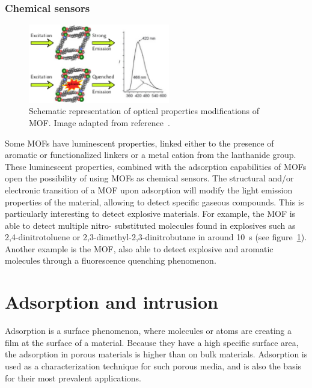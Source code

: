 \documentclass[thesis]{subfiles}
\begin{document}
\subsubsection{Chemical sensors}

\begin{figure}[ht]
    \centering
    \includegraphics[width=0.55\textwidth]{figures/cited/chemical-sensor}
    \caption{Schematic representation of optical properties modifications of
     MOF. Image adapted from reference~\cite{Lan2009}.}
    \label{fig:chemical-sensor}
\end{figure}

Some MOFs have luminescent properties, linked either to the presence of aromatic
or functionalized linkers or a metal cation from the lanthanide group. These
luminescent properties, combined with the adsorption capabilities of MOFs open
the possibility of using MOFs as chemical sensors. The structural and/or
electronic transition of a MOF upon adsorption will modify the light emission
properties of the material, allowing to detect specific gaseous compounds. This
is particularly interesting to detect explosive materials. For example, the
 MOF is able to detect multiple nitro- substituted
molecules found in explosives such as 2,4-dinitrotoluene or
2,3-dimethyl-2,3-dinitrobutane in around \SI{10}{s}\cite{Lan2009} (see
figure~\ref{fig:chemical-sensor}). Another example is the 
MOF, also able to detect explosive and aromatic molecules through a fluorescence
quenching phenomenon\cite{Pramanik2011}.

\newpage
\section{Adsorption and intrusion}

Adsorption is a surface phenomenon, where molecules or atoms are creating a film
at the surface of a material. Because they have a high specific surface area,
the adsorption in porous materials is higher than on bulk materials. Adsorption
is used as a characterization technique for such porous media, and is also the
basis for their most prevalent applications.
\end{document}
